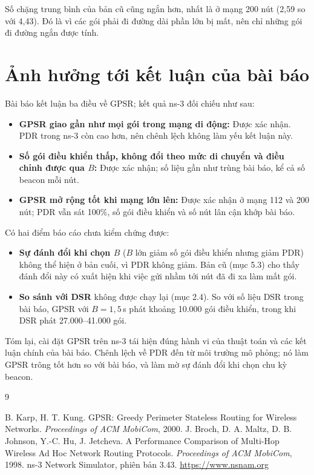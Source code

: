 \documentclass[a4paper,13pt]{extreport}
\begin{document}
Số chặng trung bình của bản cũ cũng ngắn hơn, nhất là ở mạng 200 nút (2,59 so với 4,43). Đó là vì các gói phải đi đường dài phần lớn bị mất, nên chỉ những gói đi đường ngắn được tính.

\section{Ảnh hưởng tới kết luận của bài báo}

Bài báo kết luận ba điều về GPSR; kết quả ns-3 đối chiếu như sau:
\begin{itemize}
  \item \textbf{GPSR giao gần như mọi gói trong mạng di động:} Được xác nhận. PDR trong ns-3 còn cao hơn, nên chênh lệch không làm yếu kết luận này.
  \item \textbf{Số gói điều khiển thấp, không đổi theo mức di chuyển và điều chỉnh được qua $B$:} Được xác nhận; số liệu gần như trùng bài báo, kể cả số beacon mỗi nút.
  \item \textbf{GPSR mở rộng tốt khi mạng lớn lên:} Được xác nhận ở mạng 112 và 200 nút; PDR vẫn sát 100\%, số gói điều khiển và số nút lân cận khớp bài báo.
\end{itemize}

Có hai điểm báo cáo chưa kiểm chứng được:
\begin{itemize}
  \item \textbf{Sự đánh đổi khi chọn $B$} ($B$ lớn giảm số gói điều khiển nhưng giảm PDR) không thể hiện ở bản cuối, vì PDR không giảm. Bản cũ (mục 5.3) cho thấy đánh đổi này có xuất hiện khi việc gửi nhầm tới nút đã đi xa làm mất gói.
  \item \textbf{So sánh với DSR} không được chạy lại (mục 2.4). So với số liệu DSR trong bài báo, GPSR với $B = 1{,}5$\,s phát khoảng 10.000 gói điều khiển, trong khi DSR phát 27.000--41.000 gói.
\end{itemize}

Tóm lại, cài đặt GPSR trên ns-3 tái hiện đúng hành vi của thuật toán và các kết luận chính của bài báo. Chênh lệch về PDR đến từ môi trường mô phỏng; nó làm GPSR trông tốt hơn so với bài báo, và làm mờ sự đánh đổi khi chọn chu kỳ beacon.

\begin{thebibliography}{9}
 B. Karp, H. T. Kung. GPSR: Greedy Perimeter Stateless Routing for Wireless Networks. \textit{Proceedings of ACM MobiCom}, 2000.
 J. Broch, D. A. Maltz, D. B. Johnson, Y.-C. Hu, J. Jetcheva. A Performance Comparison of Multi-Hop Wireless Ad Hoc Network Routing Protocols. \textit{Proceedings of ACM MobiCom}, 1998.
 ns-3 Network Simulator, phiên bản 3.43. \url{https://www.nsnam.org}
\end{thebibliography}
\end{document}
